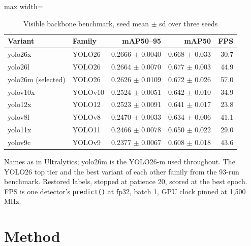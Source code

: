 \documentclass[journal]{IEEEtran}
\begin{document}
\begin{table}[!t]
\centering
\small
\caption{Visible backbone benchmark, seed mean $\pm$ sd over three seeds}
\label{tab:1}
\begin{adjustbox}{max width=\linewidth}
\begin{tabular}{llrrr}
\toprule
Variant & Family & mAP50--95 & mAP50 & FPS \\
\midrule
yolo26x & YOLO26 & 0.2666 $\pm$ 0.0040 & 0.668 $\pm$ 0.033 & 30.7 \\
yolo26l & YOLO26 & 0.2664 $\pm$ 0.0070 & 0.677 $\pm$ 0.003 & 44.9 \\
yolo26m (selected) & YOLO26 & 0.2626 $\pm$ 0.0109 & 0.672 $\pm$ 0.026 & 57.0 \\
yolov10x & YOLOv10 & 0.2524 $\pm$ 0.0051 & 0.642 $\pm$ 0.010 & 34.9 \\
yolo12x & YOLO12 & 0.2523 $\pm$ 0.0091 & 0.641 $\pm$ 0.017 & 23.8 \\
yolov8l & YOLOv8 & 0.2470 $\pm$ 0.0033 & 0.634 $\pm$ 0.006 & 41.1 \\
yolo11x & YOLO11 & 0.2466 $\pm$ 0.0078 & 0.650 $\pm$ 0.022 & 29.0 \\
yolov9c & YOLOv9 & 0.2377 $\pm$ 0.0067 & 0.608 $\pm$ 0.018 & 43.6 \\
\bottomrule
\end{tabular}
\end{adjustbox}
\par\smallskip\raggedright\footnotesize Names as in Ultralytics; yolo26m is the YOLO26-m used throughout. The YOLO26 top tier and the best variant of each other family from the 93-run benchmark. Restored labels, stopped at patience 20, scored at the best epoch. FPS is one detector's \texttt{predict()} at fp32, batch 1, GPU clock pinned at 1,500 MHz.
\end{table}
\section{Method}\label{sec:4}
\end{document}
